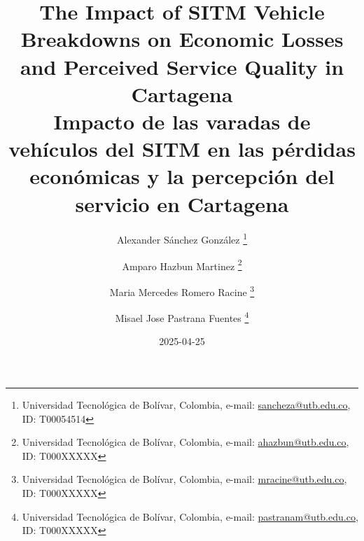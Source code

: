 \documentclass[
  letterpaper,
  DIV=11,
  numbers=noendperiod]{scrartcl}
\author{}
\date{2025-04-25}
\renewcommand*\figurename{Figure}
\newcommand\figurename{Figure}
\renewcommand*\tablename{Table}
\newcommand\tablename{Table}
\begin{document}
\renewcommand{\tablename}{Tabla}
\renewcommand{\figurename}{Figura}
\renewcommand{\refname}{References}

\renewcommand{\footrulewidth}{0.4pt}
\renewcommand{\headrulewidth}{0.4pt}

\pagestyle{fancy}
\fancyhead[R]{}
\fancyfoot[R]{}

\title{
\LARGE
The Impact of SITM Vehicle Breakdowns on Economic Losses and Perceived Service Quality in Cartagena\\[0.5em]
\large %
Impacto de las varadas de vehículos del SITM en las pérdidas económicas y la percepción del servicio en Cartagena
}

\author{Alexander Sánchez González \thanks{ Universidad Tecnológica de
Bolívar, Colombia, e-mail: \url{sancheza@utb.edu.co}, ID: T00054514}
\and Amparo Hazbun Martinez \thanks{ Universidad Tecnológica de
Bolívar, Colombia, e-mail: \url{ahazbun@utb.edu.co}, ID: T000XXXXX}
\and Maria Mercedes Romero Racine \thanks{ Universidad Tecnológica de
Bolívar, Colombia, e-mail: \url{mracine@utb.edu.co}, ID: T000XXXXX}
\and Misael Jose Pastrana Fuentes \thanks{ Universidad Tecnológica de
Bolívar, Colombia, e-mail: \url{pastranam@utb.edu.co}, ID: T000XXXXX}
}
\end{document}
